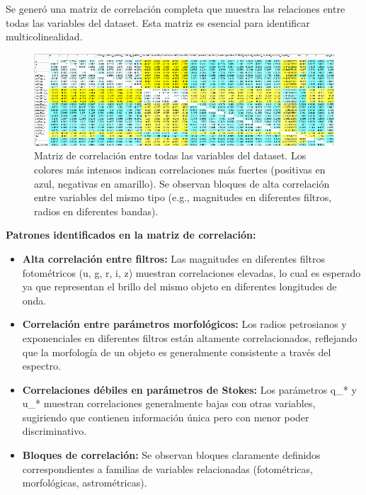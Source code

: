 \documentclass{article}
\begin{document}
Se generó una matriz de correlación completa que muestra las relaciones entre todas las variables del dataset. Esta matriz es esencial para identificar multicolinealidad.

\begin{figure}[H]
    \centering
    \includegraphics[width=1.0\linewidth]{correlacion_2.png}
    \caption{Matriz de correlación entre todas las variables del dataset. Los colores más intensos indican correlaciones más fuertes (positivas en azul, negativas en amarillo). Se observan bloques de alta correlación entre variables del mismo tipo (e.g., magnitudes en diferentes filtros, radios en diferentes bandas).}
    \label{fig:matriz_correlacion}
\end{figure}

\textbf{Patrones identificados en la matriz de correlación:}

\begin{itemize}
    \item \textbf{Alta correlación entre filtros:} Las magnitudes en diferentes filtros fotométricos (u, g, r, i, z) muestran correlaciones elevadas, lo cual es esperado ya que representan el brillo del mismo objeto en diferentes longitudes de onda.
    
    \item \textbf{Correlación entre parámetros morfológicos:} Los radios petrosianos y exponenciales en diferentes filtros están altamente correlacionados, reflejando que la morfología de un objeto es generalmente consistente a través del espectro.
    
    \item \textbf{Correlaciones débiles en parámetros de Stokes:} Los parámetros q\_* y u\_* muestran correlaciones generalmente bajas con otras variables, sugiriendo que contienen información única pero con menor poder discriminativo.
    
    \item \textbf{Bloques de correlación:} Se observan bloques claramente definidos correspondientes a familias de variables relacionadas (fotométricas, morfológicas, astrométricas).
\end{itemize}
\end{document}
